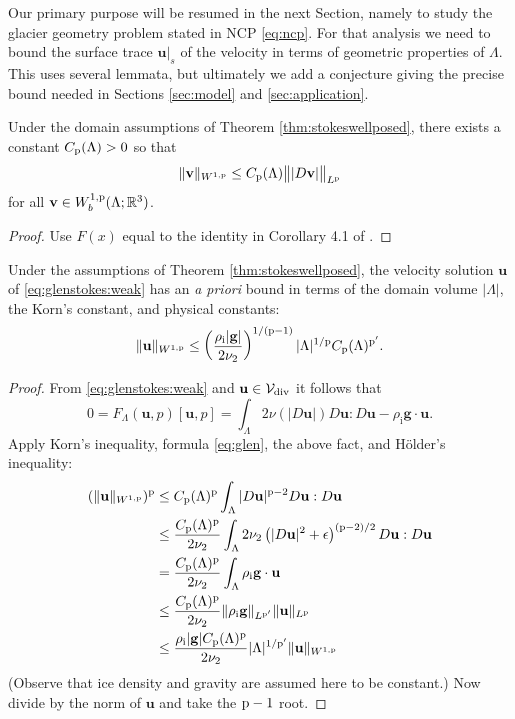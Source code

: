 \documentclass[hidelinks,onefignum,onetabnum,final]{siamart220329}  %
\newcommand{\eps}{\epsilon}
\newcommand{\RR}{\mathbb{R}}
\newcommand{\bg}{\mathbf{g}}
\newcommand{\bu}{\mathbf{u}}
\newcommand{\bv}{\mathbf{v}}
\newcommand{\cV}{\mathcal{V}}
\newcommand{\pp}{{\text{\textnormal{p}}}}
\newcommand{\rhoi}{\rho_{\text{i}}}
\newcommand{\Vdiv}{\cV_{\text{\textnormal{div}}}}
\begin{document}
Our primary purpose will be resumed in the next Section, namely to study the glacier geometry problem stated in NCP \eqref{eq:ncp}.  For that analysis we need to bound the surface trace $\bu|_s$ of the velocity in terms of geometric properties of $\Lambda$.  This uses several lemmata, but ultimately we add a conjecture giving the precise bound needed in Sections \ref{sec:model} and \ref{sec:application}.

\begin{lemma}[Korn's inequality for $L^\pp$] \label{lem:korns}
Under the domain assumptions of Theorem \ref{thm:stokeswellposed}, there exists a constant $C_{\pp}(\Lambda)>0$ so that
\begin{equation}
\|\bv\|_{W^{1,\pp}} \le C_{\pp}(\Lambda) \big\||D\bv|\big\|_{L^\pp}
\end{equation}
for all $\bv \in W_b^{1,\pp}(\Lambda; \RR^3)$.
\end{lemma}

\begin{proof}
Use $F(x)$ equal to the identity in Corollary 4.1 of \cite{Pompe2003}.
\end{proof}

\begin{lemma} \label{lem:stokesapriori}
Under the assumptions of Theorem \ref{thm:stokeswellposed}, the velocity solution $\bu$ of \eqref{eq:glenstokes:weak} has an \emph{a priori} bound in terms of the domain volume $|\Lambda|$, the Korn's constant, and physical constants:
\begin{equation}
\|\bu\|_{W^{1,\pp}} \le \left(\frac{\rhoi |\bg|}{2\nu_2}\right)^{1/(\pp-1)} |\Lambda|^{1/\pp} C_{\pp}(\Lambda)^{\pp'}.
\end{equation}
\end{lemma}

\begin{proof}
From \eqref{eq:glenstokes:weak} and $\bu \in\Vdiv$ it follows that
   $$0= F_\Lambda(\bu,p)[\bu,p] = \int_\Lambda 2 \nu(|D\bu|) D\bu : D\bu - \rhoi \bg \cdot \bu.$$
Apply Korn's inequality, formula \eqref{eq:glen}, the above fact, and H\"older's inequality:
\begin{align*}
(\|\bu\|_{W^{1,\pp}})^\pp &\le C_{\pp}(\Lambda)^\pp \int_\Lambda |D\bu|^{\pp-2} D\bu:D\bu \\
	&\le \frac{C_{\pp}(\Lambda)^\pp}{2 \nu_2} \int_\Lambda 2 \nu_2 \left(|D\bu|^2 + \eps\right)^{(\pp-2)/2} D\bu:D\bu \\
	&= \frac{C_{\pp}(\Lambda)^\pp}{2 \nu_2} \int_\Lambda \rhoi \bg \cdot \bu \\
	&\le \frac{C_{\pp}(\Lambda)^\pp}{2 \nu_2} \|\rhoi \bg\|_{L^{\pp'}} \|\bu\|_{L^\pp} \\
	&\le \frac{\rhoi |\bg| C_{\pp}(\Lambda)^\pp}{2 \nu_2} |\Lambda|^{1/\pp'} \|\bu\|_{W^{1,\pp}}
\end{align*}
(Observe that ice density and gravity are assumed here to be constant.)  Now divide by the norm of $\bu$ and take the $\pp-1$ root.
\end{proof}
\end{document}
